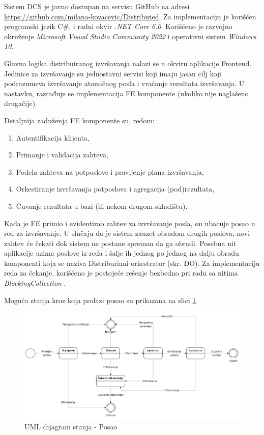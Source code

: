 \documentclass[12pt,oneside]{memoir}
\begin{document}
Sistem DCS je javno dostupan na servisu GitHub na adresi \href{https://github.com/milana-kovacevic/DistributedComputationSystem}{https://github.com/milana-kovacevic/Distributed}\label{githubdsc}. Za implementaciju je korišćen programski jezik C\#, i radni okvir \emph{.NET Core 6.0}. Korišćeno je razvojno okruženje \emph{Microsoft Visual Studio Community 2022} i operativni sistem \emph{Windows 10}.

Glavna logika distribuiranog izvršavanja nalazi se u okviru aplikacije Frontend. Jedinice za izvršavanje su jednostavni servisi koji imaju jasan cilj koji podrazumeva izvršavanje atomičnog posla i vraćanje rezultata izvršavanja. U nastavku, razrađuje se implementacija FE komponente (ukoliko nije naglašeno drugačije).

Detaljnija zaduženja FE komponente su, redom:
\begin{enumerate}
\item Autentifikacija klijenta,
\item Primanje i validacija zahteva,
\item \label{podela_planiranje}Podela zahteva na potposlove i pravljenje plana izvršavanja,
\item \label{orkestriranje}Orkestiranje izvršavanja potposlova i agregacija (pod)rezultata,
\item \label{cuvanje_u_bazi}Čuvanje rezultata u bazi (ili nekom drugom skladištu).
\end{enumerate}

Kada je FE primio i evidentirao zahtev za izvršavanje posla, on ubacuje posao u red za izvršavanje. U slučaju da je sistem zauzet obradom drugih poslova, novi zahtev će čekati dok sistem ne postane spreman da ga obradi. Posebna nit aplikacije uzima poslove iz reda i šalje ih jednog po jednog na dalju obradu komponenti koja se naziva Distriburiani orkestrator (skr. DO). Za implementaciju reda za čekanje, korišćeno je postojeće rešenje bezbedno pri radu sa nitima \emph{BlockingCollection} \cite{BlockingCollection}.

Moguća stanja kroz koja prolazi posao su prikazana na slici \ref{fig:stanjaposla}.

\begin{figure}[!ht]
  \centering
  \includegraphics[width=1.0\textwidth]{./images/dijagram_stanja_posao.png}
  \caption{UML dijagram stanja - Posao}
  \label{fig:stanjaposla}
\end{figure}
\end{document}
